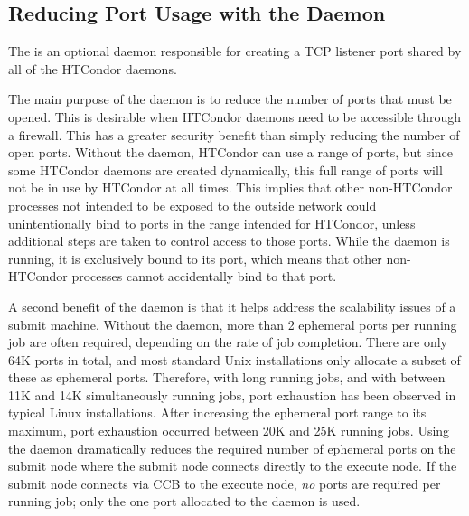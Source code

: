 \subsection{\label{sec:shared-port-daemon}Reducing Port Usage with the  Daemon}

The  is an optional daemon
responsible for creating a TCP listener port shared by all of the
HTCondor daemons.

The main purpose of the  daemon is to reduce the
number of ports that must be opened.
This is desirable when HTCondor daemons need to be
accessible through a firewall.
This has a greater security benefit
than simply reducing the number of open ports.
Without the  daemon,
HTCondor can use a range of ports,
but since some HTCondor daemons are created dynamically, 
this full range of ports will not be in use by HTCondor at all times.
This implies that other non-HTCondor processes not intended to be exposed to
the outside network could unintentionally bind to ports in the range
intended for HTCondor,
unless additional steps are taken to control access to those ports.  
While the  daemon is running,
it is exclusively bound to its port, which means that other non-HTCondor
processes cannot accidentally bind to that port.

A second benefit of the  daemon
is that it helps address the scalability issues of a submit machine.
Without the  daemon,
more than 2 ephemeral ports per running job are often required,
depending on the rate of job completion.
There are only 64K ports in total,
and most standard Unix installations only allocate a subset of
these as ephemeral ports.
Therefore, with long running jobs,
and with between 11K and 14K simultaneously running jobs,
port exhaustion has been observed in typical Linux installations.
After increasing the ephemeral port range to its maximum,
port exhaustion occurred between 20K and 25K running jobs.
Using the  daemon dramatically
reduces the required number of ephemeral ports on the submit node
where the submit node connects directly to the execute node.
If the submit node connects via CCB to the execute
node, \emph{no} ports are required per running job; only the one port
allocated to the  daemon is used.

